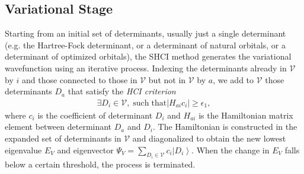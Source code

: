 \documentclass[%
reprint,
 superscriptaddress,
 amsmath,amssymb,
 aps,
]{revtex4-1}
\def\V{\mathcal{V}}
\def\beq{\begin{eqnarray}}
\def\eeq{\end{eqnarray}}
\begin{document}
\subsection{Variational Stage}
%
%
%

Starting from an initial set of determinants, usually just a single determinant (e.g. the Hartree-Fock determinant,
or a determinant of natural orbitals, or a determinant of optimized orbitals),
the SHCI method generates the variational wavefunction using an iterative process.
Indexing the determinants already in $\V$ by $i$ and those connected to those in $\V$ but not in $\V$ by $a$,
we add to $\V$ those determinants $D_a$ that satisfy the {\it HCI criterion}
\beq
\exists D_{i} \in \V, \; \mathrm{such\; that} \left|H_{ai} c_{i}\right| \ge \epsilon_{1},
\label{eq:hci_criterion}
\eeq
where $c_i$ is the coefficient of determinant $D_i$ and $H_{ai}$ is the Hamiltonian matrix element between determinant $D_a$ and $D_i$.
The Hamiltonian is constructed in the expanded set of determinants in $\V$ and diagonalized to obtain the new lowest eigenvalue $E_{V}$ and eigenvector $\Psi _{V} = \sum _{D _{i} \in \V} c _{i} \left|D _{i}\right\rangle$.
When the change in $E_V$ falls below a certain threshold, the process is terminated.
\end{document}
